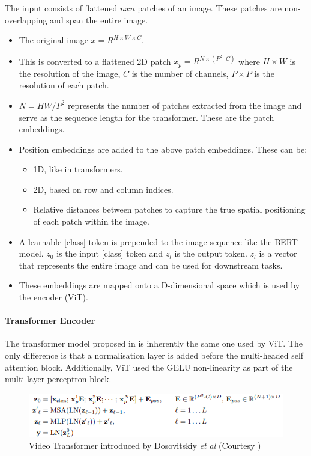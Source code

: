 \par The input consists of flattened $nxn$ patches of an image. These patches are non-overlapping and span the entire image. 
\begin{itemize}
	\item The original image $x = R^{H \times W \times C}$.
	\item This is converted to a flattened 2D patch $x_p = R^{N \times (P^2 \cdot C)}$ where $H \times W$ is the resolution of the image, $C$ is the number of channels, $P \times P$ is the resolution of each patch.
	\item $N = HW / P^2$ represents the number of patches extracted from the image and serve as the sequence length for the transformer. These are the patch embeddings.
	\item Position embeddings are added to the above patch embeddings. These can be:
	\begin{itemize}
		\item 1D, like in transformers.
		\item 2D, based on row and column indices.
		\item Relative distances between patches to capture the true spatial positioning of each patch within the image.
	\end{itemize}
	\item A learnable [class] token is prepended to the image sequence like the BERT model. $z_0$ is the input [class] token and $z_l$ is the output token. $z_l$ is a vector that represents the entire image and can be used for downstream tasks.
	\item These embeddings are mapped onto a D-dimensional space which is used by the encoder (ViT).
\end{itemize}
\par

\paragraph{Transformer Encoder}

\par The transformer model proposed in \cite{tfm} is inherently the same one used by ViT. The only difference is that a normalisation layer is added before the multi-headed self attention block. Additionally, ViT used the GELU non-linearity as part of the multi-layer perceptron block. \par

\begin{figure}
	\centering
	\includegraphics[width=\linewidth]{assets/img/vit-eq.png}
	\caption{Video Transformer introduced by Dosovitskiy \textit{et al} (Courtesy \cite{vit})}
\end{figure}


